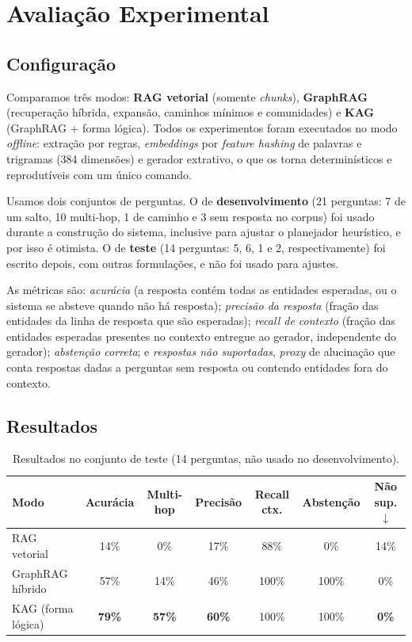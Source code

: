 \documentclass[12pt]{article}
\begin{document}
\section{Avaliação Experimental}

\subsection{Configuração}

Comparamos três modos: \textbf{RAG vetorial} (somente \textit{chunks}), \textbf{GraphRAG} (recuperação híbrida, expansão, caminhos mínimos e comunidades) e \textbf{KAG} (GraphRAG + forma lógica). Todos os experimentos foram executados no modo \textit{offline}: extração por regras, \textit{embeddings} por \textit{feature hashing} de palavras e trigramas (384 dimensões) e gerador extrativo, o que os torna determinísticos e reprodutíveis com um único comando.

Usamos dois conjuntos de perguntas. O de \textbf{desenvolvimento} (21 perguntas: 7 de um salto, 10 multi-hop, 1 de caminho e 3 sem resposta no corpus) foi usado durante a construção do sistema, inclusive para ajustar o planejador heurístico, e por isso é otimista. O de \textbf{teste} (14 perguntas: 5, 6, 1 e 2, respectivamente) foi escrito depois, com outras formulações, e não foi usado para ajustes.

As métricas são: \textit{acurácia} (a resposta contém todas as entidades esperadas, ou o sistema se absteve quando não há resposta); \textit{precisão da resposta} (fração das entidades da linha de resposta que são esperadas); \textit{recall de contexto} (fração das entidades esperadas presentes no contexto entregue ao gerador, independente do gerador); \textit{abstenção correta}; e \textit{respostas não suportadas}, \textit{proxy} de alucinação que conta respostas dadas a perguntas sem resposta ou contendo entidades fora do contexto.

\subsection{Resultados}

\begin{table}[ht]
\centering
\caption{Resultados no conjunto de teste (14 perguntas, não usado no desenvolvimento).}
\label{tab:teste}
{\small\setlength{\tabcolsep}{4pt}\begin{tabular}{lcccccc}
\toprule
Modo & Acurácia & Multi-hop & Precisão & Recall ctx. & Abstenção & Não sup.$\downarrow$ \\
\midrule
RAG vetorial & 14\% & 0\% & 17\% & 88\% & 0\% & 14\% \\
GraphRAG híbrido & 57\% & 14\% & 46\% & 100\% & 100\% & 0\% \\
KAG (forma lógica) & \textbf{79\%} & \textbf{57\%} & \textbf{60\%} & 100\% & 100\% & \textbf{0\%} \\
\bottomrule
\end{tabular}}
\end{table}
\end{document}
